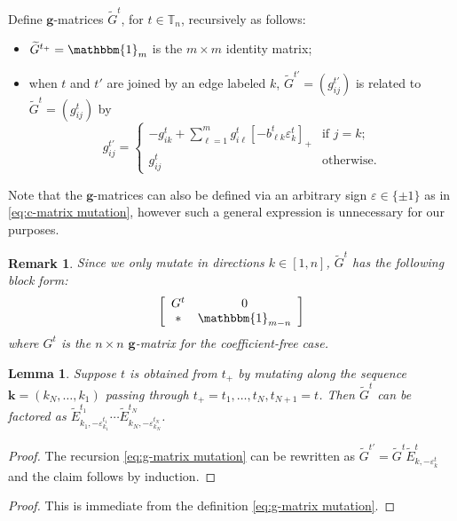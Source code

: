 \documentclass{amsart}
\newtheorem{lemma}[theorem]{Lemma}
\newtheorem{remark}[theorem]{Remark}
\numberwithin{theorem}{section}
\newcommand{\bfg}{\boldsymbol{g}}
\newcommand{\bfk}{{\boldsymbol{k}}}
\newcommand{\TT}{\mathbb{T}}
\newcommand{\bOne}{\mathbbm{1}}
\begin{document}
  Define $\bfg$-matrices $\widetilde G^t$, for $t\in\TT_n$, recursively as follows:
  \begin{itemize}
    \item $\widetilde G^{t_+} = \bOne_m$ is the $m\times m$ identity matrix;
    \item when $t$ and $t'$ are joined by an edge labeled $k$, $\widetilde G^{t'}=(g^{t'}_{ij})$ is related to $\widetilde G^t=(g^t_{ij})$ by
      \begin{equation}
        \label{eq:g-matrix mutation}
        g^{t'}_{ij} = \begin{cases} -g^t_{ik} + \sum\limits_{\ell=1}^m g^t_{i\ell} [-b^t_{\ell k} \varepsilon^t_k]_+ & \text{if $j=k$;}\\ g^t_{ij} & \text{otherwise.} \end{cases}
      \end{equation}
  \end{itemize}
  Note that the $\bfg$-matrices can also be defined via an arbitrary sign $\varepsilon\in\{\pm 1\}$ as in \eqref{eq:c-matrix mutation}, however such a general expression is unnecessary for our purposes.
  \begin{remark}
    Since we only mutate in directions $k\in[1,n]$, $\widetilde G^t$ has the following block form:
    \[\left[\begin{array}{cc} G^t & 0\\ * & \bOne_{m-n}\end{array}\right]\]
    where $G^t$ is the $n\times n$ $\bfg$-matrix for the coefficient-free case.
  \end{remark}

  \begin{lemma}
    \label{le:g-matrix factorization}
    Suppose $t$ is obtained from $t_+$ by mutating along the sequence $\bfk=(k_N,\ldots,k_1)$ passing through $t_+=t_1,\ldots,t_N,t_{N+1}=t$.
    Then $\widetilde G^t$ can be factored as $\widetilde E^{t_1}_{k_1,-\varepsilon^{t_1}_{k_1}}\cdots \widetilde E^{t_N}_{k_N,-\varepsilon^{t_N}_{k_N}}$.
  \end{lemma}
  \begin{proof}
    The recursion \eqref{eq:g-matrix mutation} can be rewritten as $\widetilde G^{t'}=\widetilde G^t \widetilde E^t_{k,-\varepsilon^t_k}$ and the claim follows by induction.
  \end{proof}
  \begin{proof}
    This is immediate from the definition \eqref{eq:g-matrix mutation}.
  \end{proof}
\end{document}
